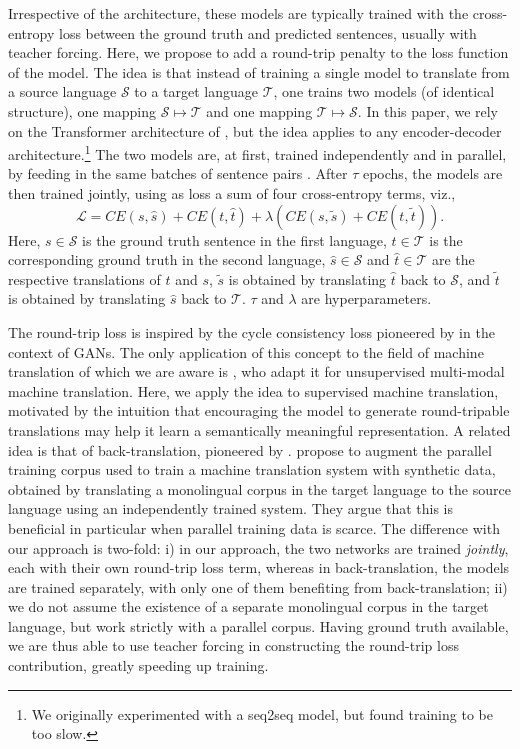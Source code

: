 \documentclass[11pt,a4paper]{article}
\begin{document}
Irrespective of the architecture, these models are typically trained with the cross-entropy loss between the ground truth and predicted sentences, usually with teacher forcing.
Here, we propose to add a round-trip penalty to the loss function of the model. The idea is that instead of training a single model to translate from a source language $\mathcal{S}$ to a target language $\mathcal{T}$, one trains two models (of identical structure), one mapping $\mathcal{S}\mapsto \mathcal{T}$ and one mapping $\mathcal{T}\mapsto \mathcal{S}$. In this paper, we rely on the Transformer architecture of \citet{transformer}, but the idea applies to any encoder-decoder architecture.\footnote{We originally experimented with a seq2seq model, but found training to be too slow.} The two models are, at first, trained independently and in parallel, by feeding in the same batches of sentence pairs . After $\tau$ epochs, the models are then trained jointly, using as loss a sum of four cross-entropy terms, viz.,
\begin{equation}
\mathcal{L} = CE(s, \hat{s}) + CE(t, \hat{t}) + \lambda \left( CE(s, \tilde{s}) + CE(t, \tilde{t})\right).
\label{eq:RTL}
\end{equation}
Here, $s\in\mathcal{S}$ is the ground truth sentence in the first language, $t\in\mathcal{T}$ is the corresponding ground truth in the second language, $\hat{s}\in\mathcal{S}$ and $\hat{t}\in\mathcal{T}$ are the respective translations of $t$ and $s$, $\tilde{s}$ is obtained by translating $\hat{t}$ back to $\mathcal{S}$, and $\tilde{t}$ is obtained by translating $\hat{s}$ back to $\mathcal{T}$. $\tau$ and $\lambda$ are hyperparameters.

The round-trip loss is inspired by the cycle consistency loss pioneered by \citet{CycleGAN2017} in the context of GANs. The only application of this concept to the field of machine translation of which we are aware is \citet{su:2018}, who adapt it for unsupervised multi-modal machine translation. Here, we apply the idea to supervised machine translation, motivated by the intuition that encouraging the model to generate round-tripable translations may help it learn a semantically meaningful representation. A related idea is that of back-translation, pioneered by \citet{backtrans}. \citeauthor{backtrans} propose to augment the parallel training corpus used to train a machine translation system with synthetic data, obtained by translating a monolingual corpus in the target language to the source language using an independently trained system. They argue that this is beneficial in particular when parallel training data is scarce. The difference with our approach is two-fold: i) in our approach, the two networks are trained \emph{jointly}, each with their own round-trip loss term, whereas in back-translation, the models are trained separately, with only one of them benefiting from back-translation; ii) we do not assume the existence of a separate monolingual corpus in the target language, but work strictly with a parallel corpus. Having ground truth available, we are thus able to use teacher forcing in constructing the round-trip loss contribution, greatly speeding up training.
\end{document}
